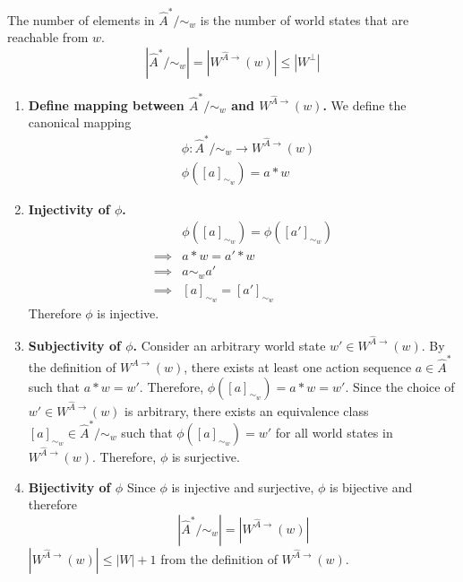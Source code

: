 \begin{propositionE}\label{prp:local_algebra_cardinality}
The number of elements in $\hat{A}^{*}/\sim_{w}$ is the number of world states that are reachable from $w$.
    \begin{equation}
        |\hat{A}^{*}/\sim_{w}| = |W^{\hat{A}\to}(w)| \leq |W^{\bot}|
    \end{equation}
\end{propositionE}
\begin{proofE}
\begin{enumerate}[(1)]
    \item \textbf{Define mapping between $\hat{A}^{*}/\sim_{w}$ and $W^{\hat{A}\to}(w)$.}
    We define the canonical mapping
    \begin{equation}
    \begin{aligned}
        & \phi: \hat{A}^{*}/\sim_{w} \to W^{\hat{A}\to}(w) \\
        & \phi([a]_{\sim_{w}}) = a \ast w
    \end{aligned}
    \end{equation}

    \item \textbf{Injectivity of $\phi$.}
    \begin{align}
        & \phi([a]_{\sim_{w}}) = \phi([a']_{\sim_{w}}) \\
        \implies & a \ast w = a' \ast w \\
        \implies & a \sim_{w} a' \\
        \implies & [a]_{\sim_{w}} = [a']_{\sim_{w}}
    \end{align}
    Therefore $\phi$ is injective.

    \item \textbf{Subjectivity of $\phi$.}
    Consider an arbitrary world state $w' \in W^{\hat{A}\to}(w)$.
    By the definition of $W^{\hat{A}\to}(w)$, there exists at least one action sequence $a \in \hat{A}^{*}$ such that $a \ast w = w'$.
    Therefore, $\phi([a]_{\sim_{w}}) = a \ast w = w'$.
    Since the choice of $w' \in W^{\hat{A}\to}(w)$ is arbitrary, there exists an equivalence class $[a]_{\sim_{w}} \in \hat{A}^{*}/\sim_{w}$ such that $\phi([a]_{\sim_{w}}) = w'$ for all world states in $W^{\hat{A}\to}(w)$.
    Therefore, $\phi$ is surjective.

    \item \textbf{Bijectivity of $\phi$}
    Since $\phi$ is injective and surjective, $\phi$ is bijective and therefore
    \begin{equation}
        |\hat{A}^{*}/\sim_{w}| = |W^{\hat{A}\to}(w)|
    \end{equation}
    $|W^{\hat{A}\to}(w)| \leq |W| + 1$ from the definition of $W^{\hat{A}\to}(w)$.
\end{enumerate}
\end{proofE}

